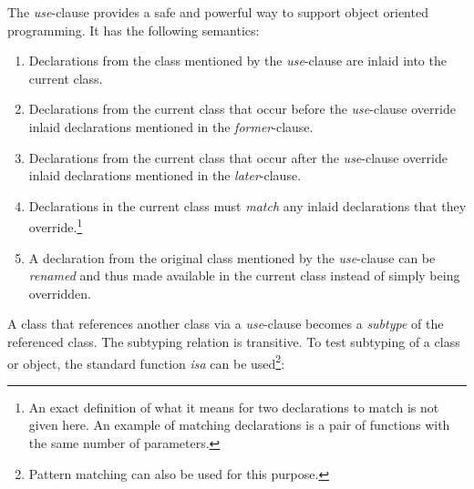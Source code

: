 \documentclass[preprint]{sigplanconf}
\begin{document}
The \emph{use}-clause provides a safe and powerful way to support object
oriented programming.  It has the following semantics:

\begin{enumerate}
\item Declarations from the class mentioned by the \emph{use}-clause are inlaid into the current class.
\item Declarations from the current class that occur before the \emph{use}-clause override inlaid declarations mentioned in the \emph{former}-clause.
\item Declarations from the current class that occur after the \emph{use}-clause override inlaid declarations mentioned in the \emph{later}-clause.
\item Declarations in the current class must \emph{match} any inlaid declarations that they override.\footnote{An
        exact definition of what it means for two declarations to match
        is not given here. An example
        of matching declarations is a pair of functions with the same number of parameters.}
\item A declaration from the original class mentioned by the \emph{use}-clause can be \emph{renamed} and thus made available in the current class instead of simply being overridden.
\end{enumerate}

A class that references another class via a \emph{use}-clause becomes a \emph{subtype} of the referenced class. The subtyping relation is transitive.
To test subtyping of a class or object, the standard function \emph{isa}
can be used\footnote{Pattern matching can also be used for this purpose.}:
\end{document}
